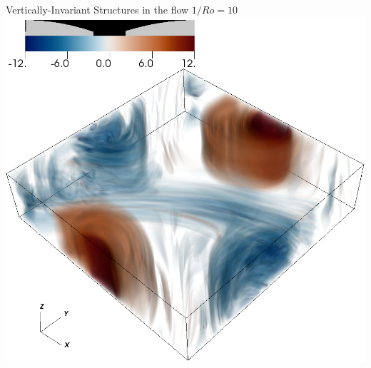 \documentclass[aspecttatio=169]{beamer}
\begin{document}
\begin{frame}{Vertically-Invariant Structures in the flow}
    \emp
        \centering
        $1/Ro = 10$
        \includegraphics[width=.95\textwidth]{images/vortz_Om10_vr2.png}
    \emp
\end{frame}
\end{document}
